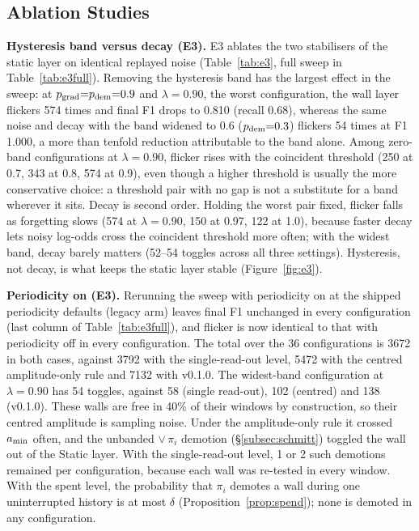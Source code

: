 \subsection{Ablation Studies}\label{subsec:ablation}




\noindent\textbf{Hysteresis band versus decay (E3).} E3 ablates the two stabilisers of the static layer on identical replayed noise (Table~\ref{tab:e3}, full sweep in Table~\ref{tab:e3full}). Removing the hysteresis band has the largest effect in the sweep: at $p_{\mathrm{grad}}{=}p_{\mathrm{dem}}{=}0.9$ and $\lambda{=}0.90$, the worst configuration, the wall layer flickers 574 times and final F1 drops to 0.810 (recall 0.68), whereas the same noise and decay with the band widened to 0.6 ($p_{\mathrm{dem}}{=}0.3$) flickers 54 times at F1 1.000, a more than tenfold reduction attributable to the band alone. Among zero-band configurations at $\lambda{=}0.90$, flicker rises with the coincident threshold (250 at 0.7, 343 at 0.8, 574 at 0.9), even though a higher threshold is usually the more conservative choice: a threshold pair with no gap is not a substitute for a band wherever it sits. Decay is second order. Holding the worst pair fixed, flicker falls as forgetting slows (574 at $\lambda{=}0.90$, 150 at 0.97, 122 at 1.0), because faster decay lets noisy log-odds cross the coincident threshold more often; with the widest band, decay barely matters (52--54 toggles across all three settings). Hysteresis, not decay, is what keeps the static layer stable (Figure~\ref{fig:e3}).

\noindent\textbf{Periodicity on (E3).} Rerunning the sweep with periodicity on at the shipped periodicity defaults (legacy arm) leaves final F1 unchanged in every configuration (last column of Table~\ref{tab:e3full}), and flicker is now identical to that with periodicity off in every configuration. The total over the 36 configurations is 3672 in both cases, against 3792 with the single-read-out level, 5472 with the centred amplitude-only rule and 7132 with v0.1.0. The widest-band configuration at $\lambda{=}0.90$ has 54 toggles, against 58 (single read-out), 102 (centred) and 138 (v0.1.0). These walls are free in 40\% of their windows by construction, so their centred amplitude is sampling noise. Under the amplitude-only rule it crossed $a_{\min}$ often, and the unbanded $\lor\,\pi_i$ demotion (\S\ref{subsec:schmitt}) toggled the wall out of the Static layer. With the single-read-out level, 1 or 2 such demotions remained per configuration, because each wall was re-tested in every window. With the spent level, the probability that $\pi_i$ demotes a wall during one uninterrupted history is at most $\delta$ (Proposition~\ref{prop:spend}); none is demoted in any configuration.

